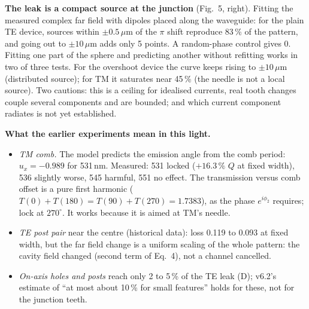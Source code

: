 \documentclass[11pt,a4paper]{article}
\begin{document}
\textbf{The leak is a compact source at the junction} (Fig.~5, right). Fitting the measured complex far field with
dipoles placed along the waveguide: for the plain TE device, sources within $\pm0.5$\,$\mu$m of the $\pi$ shift reproduce
83\,\% of the pattern, and going out to $\pm10$\,$\mu$m adds only 5 points. A random-phase control gives 0. Fitting one
part of the sphere and predicting another without refitting works in two of three tests. For the overshoot device the
curve keeps rising to $\pm10$\,$\mu$m (distributed source); for TM it saturates near 45\,\% (the needle is not a local
source). Two cautions: this is a ceiling for idealised currents, real tooth changes couple several components and are
bounded; and which current component radiates is not yet established.

\textbf{What the earlier experiments mean in this light.}
\begin{itemize}\setlength{\itemsep}{1pt}
\item \emph{TM comb.} The model predicts the emission angle from the comb period: $u_x=-0.989$ for 531\,nm. Measured: 531
locked ($+16.3\,\%$ $Q$ at fixed width), 536 slightly worse, 545 harmful, 551 no effect. The transmission versus comb
offset is a pure first harmonic ($T(0)+T(180)=T(90)+T(270)=1.7383$), as the phase $e^{i\phi_2}$ requires; lock at $270^\circ$.
It works because it is aimed at TM's needle.
\item \emph{TE post pair} near the centre (historical data): loss 0.119 to 0.093 at fixed width, but the far field change
is a uniform scaling of the whole pattern: the cavity field changed (second term of Eq.~4), not a channel cancelled.
\item \emph{On-axis holes and posts} reach only 2 to 5\,\% of the TE leak (D); v6.2's estimate of ``at most about 10\,\%
for small features'' holds for these, not for the junction teeth.
\end{itemize}
\end{document}
